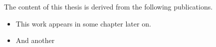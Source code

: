 The content of this thesis is derived from the following publications.

\begin{itemize}
    \item

        This work appears in some chapter later on.

    \item And another
\end{itemize}
